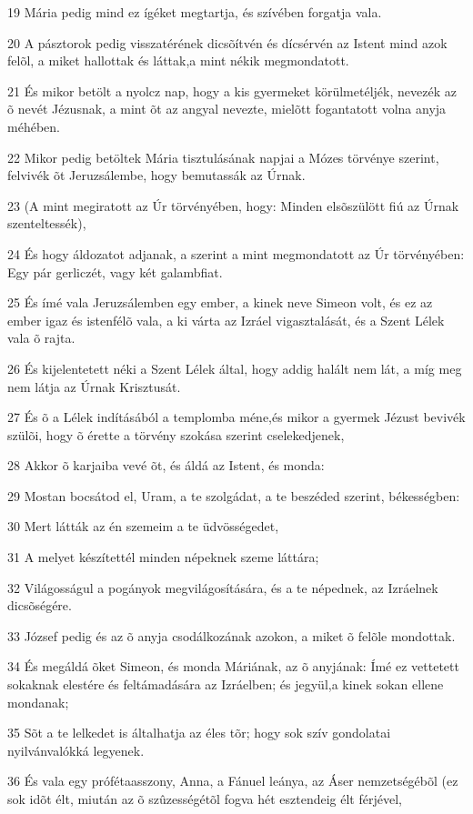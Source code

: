 \par 19 Mária pedig mind ez ígéket megtartja, és szívében forgatja vala.
\par 20 A pásztorok pedig visszatérének dicsõítvén és dícsérvén az Istent mind azok felõl, a miket hallottak és láttak,a mint nékik megmondatott.
\par 21 És mikor betölt a nyolcz nap, hogy a kis gyermeket körülmetéljék, nevezék az õ nevét Jézusnak, a mint õt az angyal nevezte, mielõtt fogantatott volna anyja méhében.
\par 22 Mikor pedig betöltek Mária tisztulásának napjai a Mózes törvénye szerint, felvivék õt Jeruzsálembe, hogy bemutassák az Úrnak.
\par 23 (A mint megiratott az Úr törvényében, hogy: Minden elsõszülött fiú az Úrnak szenteltessék),
\par 24 És hogy áldozatot adjanak, a szerint a mint megmondatott az Úr törvényében: Egy pár gerliczét, vagy két galambfiat.
\par 25 És ímé vala Jeruzsálemben egy ember, a kinek neve Simeon volt, és ez az ember igaz és istenfélõ vala, a ki várta az Izráel vigasztalását, és a Szent Lélek vala õ rajta.
\par 26 És kijelentetett néki a Szent Lélek által, hogy addig halált nem lát, a míg meg nem látja az Úrnak Krisztusát.
\par 27 És õ a Lélek indításából a templomba méne,és mikor a gyermek Jézust bevivék szülõi, hogy õ érette a törvény szokása szerint cselekedjenek,
\par 28 Akkor õ karjaiba vevé õt, és áldá az Istent, és monda:
\par 29 Mostan bocsátod el, Uram, a te szolgádat, a te beszéded szerint, békességben:
\par 30 Mert látták az én szemeim a te üdvösségedet,
\par 31 A melyet készítettél minden népeknek szeme láttára;
\par 32 Világosságul a pogányok megvilágosítására, és a te népednek, az Izráelnek dicsõségére.
\par 33 József pedig és az õ anyja csodálkozának azokon, a miket õ felõle mondottak.
\par 34 És megáldá õket Simeon, és monda Máriának, az õ anyjának: Ímé ez vettetett sokaknak elestére és feltámadására az Izráelben; és jegyül,a kinek sokan ellene  mondanak;
\par 35 Sõt a te lelkedet is általhatja az éles tõr; hogy sok szív gondolatai nyilvánvalókká legyenek.
\par 36 És vala egy prófétaasszony, Anna, a Fánuel leánya, az Áser nemzetségébõl (ez sok idõt élt, miután az õ szûzességétõl fogva hét esztendeig élt férjével,
